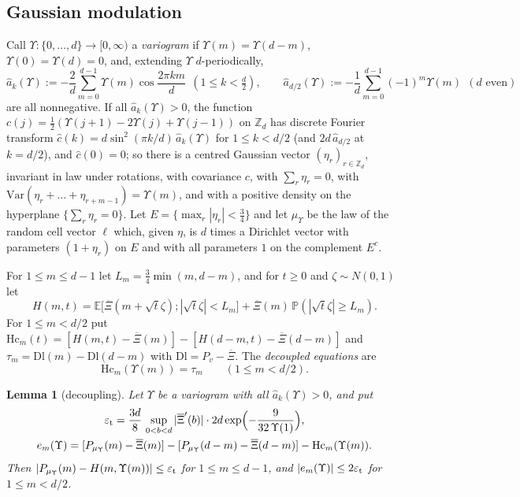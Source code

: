 \documentclass[11pt]{amsart}
\newtheorem{lemma}[theorem]{Lemma}
\theoremstyle{definition}
\theoremstyle{remark}
\numberwithin{equation}{section}
\newcommand{\Z}{\mathbb{Z}}
\newcommand{\E}{\mathbb{E}}
\renewcommand{\Pr}{\mathbb{P}}
\newcommand{\Xb}{\overline{\Xi}}
\begin{document}
\subsection{Gaussian modulation}
Call $\Upsilon\colon\{0,\dots,d\}\to[0,\infty)$ a \emph{variogram} if $\Upsilon(m)=\Upsilon(d-m)$, $\Upsilon(0)=\Upsilon(d)=0$, and, extending
$\Upsilon$ $d$-periodically,
\[
\hat a_k(\Upsilon):=-\frac2d\sum_{m=0}^{d-1}\Upsilon(m)\cos\frac{2\pi km}d\ \ (1\le k<\tfrac d2),\qquad
\hat a_{d/2}(\Upsilon):=-\frac1d\sum_{m=0}^{d-1}(-1)^m\Upsilon(m)\ \ (d\text{ even})
\]
are all nonnegative. If all $\hat a_k(\Upsilon)>0$, the function $c(j)=\frac12(\Upsilon(j+1)-2\Upsilon(j)+\Upsilon(j-1))$ on $\Z_d$ has
discrete Fourier transform $\hat c(k)=d\sin^2(\pi k/d)\,\hat a_k(\Upsilon)$ for $1\le k<d/2$ (and $2d\,\hat a_{d/2}$ at $k=d/2$),
and $\hat c(0)=0$; so there is a centred Gaussian vector $(\eta_r)_{r\in\Z_d}$, invariant in law under rotations, with
covariance $c$, with $\sum_r\eta_r=0$, with $\mathrm{Var}(\eta_r+\dots+\eta_{r+m-1})=\Upsilon(m)$, and with a positive
density on the hyperplane $\{\sum_r\eta_r=0\}$. Let $E=\{\max_r|\eta_r|<\frac34\}$ and let $\mu_\Upsilon$ be the law of the random
cell vector $\ell$ which, given $\eta$, is $d$ times a Dirichlet vector with parameters $(1+\eta_r)$ on $E$ and with all
parameters $1$ on the complement $E^c$.

For $1\le m\le d-1$ let $L_m=\frac34\min(m,d-m)$, and for $t\ge0$ and $\zeta\sim N(0,1)$ let
\[
H(m,t)=\E\bigl[\Xb(m+\sqrt t\zeta);|\sqrt t\zeta|<L_m\bigr]+\Xb(m)\,\Pr(|\sqrt t\zeta|\ge L_m).
\]
For $1\le m<d/2$ put $\mathrm{Hc}_m(t)=[H(m,t)-\Xb(m)]-[H(d-m,t)-\Xb(d-m)]$ and $\tau_m=\mathrm{Dl}(m)-\mathrm{Dl}(d-m)$ with
$\mathrm{Dl}=P_v-\Xb$. The \emph{decoupled equations} are
\begin{equation}\label{eq:decoupled}
\mathrm{Hc}_m(\Upsilon(m))=\tau_m\qquad(1\le m<d/2).
\end{equation}

\begin{lemma}[decoupling]\label{lem:decoupling}
Let $\Upsilon$ be a variogram with all $\hat a_k(\Upsilon)>0$, and put
\begin{gather*}
\varepsilon_{\rm t}=\frac{3d}8\,\sup_{0<b<d}|\Xb'(b)|\cdot2d\exp\Bigl(-\frac9{32\,\Upsilon(1)}\Bigr),\\
e_m(\Upsilon)=[P_{\mu_\Upsilon}(m)-\Xb(m)]-[P_{\mu_\Upsilon}(d-m)-\Xb(d-m)]-\mathrm{Hc}_m(\Upsilon(m)).
\end{gather*}
Then $|P_{\mu_\Upsilon}(m)-H(m,\Upsilon(m))|\le\varepsilon_{\rm t}$ for $1\le m\le d-1$, and $|e_m(\Upsilon)|\le2\varepsilon_{\rm t}$ for $1\le m<d/2$.
\end{lemma}
\end{document}
